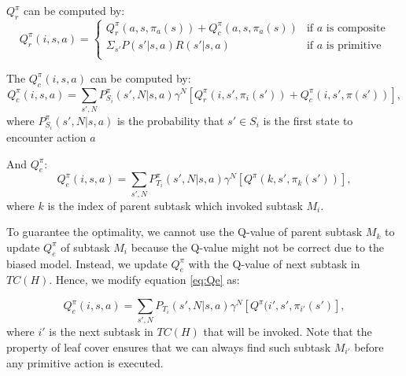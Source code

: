 \documentclass{article} %
\begin{document}


$Q_r^{\pi}$ can be computed by:
\begin{equation}
    Q_r^{\pi}(i, s, a) = 
    \left\{\begin{array}{ll}
        Q_r^{\pi}(a, s, \pi_a(s)) + Q_c^{\pi}(a, s, \pi_a(s))& \mbox{if $a$ is composite} \\
        \Sigma_{s'} P(s'|s, a)R(s'|s, a) & \mbox{if $a$ is primitive} \\  
    \end{array} \right.
    \label{eq:Qr}
\end{equation}

The $Q_c^{\pi}(i, s, a)$ can be computed by:
\begin{equation}
    Q_c^{\pi}(i, s, a) = \sum_{s', N} P_{S_i}^{\pi}(s', N|s, a)\gamma^N[Q_r^{\pi}(i, s', \pi_i(s')) + Q_c^{\pi}(i, s', \pi(s'))],
    \label{eq:Qc}
\end{equation}
where $P_{S_i}^{\pi}(s', N|s, a)$ is the probability that $s' \in S_i$ is the first state
to encounter action $a$


And $Q_e^{\pi}$:
\begin{equation}
    Q_e^{\pi}(i, s, a) = \sum_{s', N} P_{T_i}^{\pi}(s', N|s, a)\gamma^N[Q^{\pi}(k, s', \pi_k(s'))],
    \label{eq:Qe}
\end{equation}
where $k$ is the index of parent subtask which invoked subtask $M_i$.

To guarantee the optimality, we cannot use the Q-value of parent subtask $M_k$ to update $Q_e^{\pi}$ of subtask $M_i$ because the 
Q-value might not be correct due to the biased model.  Instead, 
we update $Q_e^{\pi}$ with the Q-value of next subtask in $TC(H)$.
Hence, we modify equation \ref{eq:Qe} as:

\begin{equation}
    Q_e^{\pi}(i, s, a) = \sum_{s', N} P_{T_i}(s', N|s, a)\gamma^N[Q^{\pi}(i', s', \pi_{i'}(s')],
    \label{eq:OptQe}
\end{equation}
where $i'$ is the next subtask in $TC(H)$ that will be invoked. 
Note that the property of leaf cover ensures that we can always find such subtask $M_{i'}$ before any primitive
action is executed. %
\end{document}
